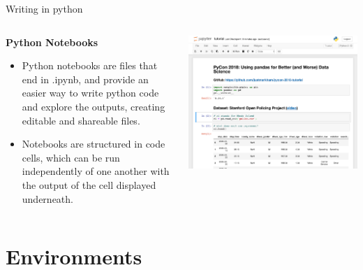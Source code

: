 \documentclass[aspectratio=169]{beamer}
\begin{document}
\begin{frame}{Writing in python}
	\begin{columns}
	
	\begin{column}{0.6\textwidth}
	
		\textbf{Python Notebooks}
		
		\begin{itemize}	

		\item Python notebooks are files that end in .ipynb, and provide an easier way to write python code and explore the outputs, creating editable and shareable files. 
		\item Notebooks are structured in code cells, which can be run independently of one another with the output of the cell displayed underneath.
	\end{itemize}
		
	\end{column}
	
		\begin{column}{0.4\textwidth}
		
		\includegraphics[scale=.6]{graphics/notebook.png}
			
	\end{column}
	\end{columns}
\end{frame}

\section{Environments}
\end{document}
